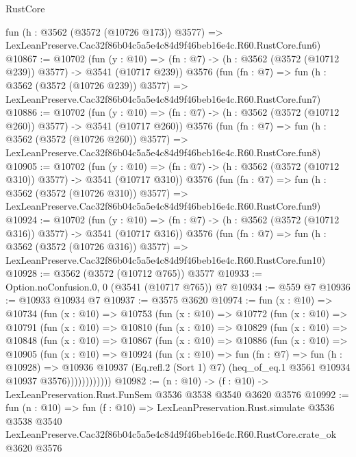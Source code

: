 \begin{lexlean}{RustCore}
\begin{coremodule}
    fun (h : @3562 (@3572 (@10726 @173)) @3577) =>
    LexLeanPreserve.Cac32f86b04c5a5e4c84d9f46beb16e4c.R60.RustCore.fun6)
@10867 := @10702
    (fun (y : @10) => (fn : @7) -> (h : @3562 (@3572 (@10712 @239)) @3577) -> @3541 (@10717 @239))
    @3576
    (fun (fn : @7) =>
    fun (h : @3562 (@3572 (@10726 @239)) @3577) =>
    LexLeanPreserve.Cac32f86b04c5a5e4c84d9f46beb16e4c.R60.RustCore.fun7)
@10886 := @10702
    (fun (y : @10) => (fn : @7) -> (h : @3562 (@3572 (@10712 @260)) @3577) -> @3541 (@10717 @260))
    @3576
    (fun (fn : @7) =>
    fun (h : @3562 (@3572 (@10726 @260)) @3577) =>
    LexLeanPreserve.Cac32f86b04c5a5e4c84d9f46beb16e4c.R60.RustCore.fun8)
@10905 := @10702
    (fun (y : @10) => (fn : @7) -> (h : @3562 (@3572 (@10712 @310)) @3577) -> @3541 (@10717 @310))
    @3576
    (fun (fn : @7) =>
    fun (h : @3562 (@3572 (@10726 @310)) @3577) =>
    LexLeanPreserve.Cac32f86b04c5a5e4c84d9f46beb16e4c.R60.RustCore.fun9)
@10924 := @10702
    (fun (y : @10) => (fn : @7) -> (h : @3562 (@3572 (@10712 @316)) @3577) -> @3541 (@10717 @316))
    @3576
    (fun (fn : @7) =>
    fun (h : @3562 (@3572 (@10726 @316)) @3577) =>
    LexLeanPreserve.Cac32f86b04c5a5e4c84d9f46beb16e4c.R60.RustCore.fun10)
@10928 := @3562 (@3572 (@10712 @765)) @3577
@10933 := Option.noConfusion.{0, 0} (@3541 (@10717 @765)) @7
@10934 := @559 @7
@10936 := @10933 @10934 @7
@10937 := @3575 @3620
@10974 := fun (x : @10) =>
  @10734
    (fun (x : @10) =>
    @10753
      (fun (x : @10) =>
      @10772
        (fun (x : @10) =>
        @10791
          (fun (x : @10) =>
          @10810
            (fun (x : @10) =>
            @10829
              (fun (x : @10) =>
              @10848
                (fun (x : @10) =>
                @10867
                  (fun (x : @10) =>
                  @10886
                    (fun (x : @10) =>
                    @10905
                      (fun (x : @10) =>
                      @10924
                        (fun (x : @10) =>
                        fun (fn : @7) =>
                        fun (h : @10928) =>
                        @10936
                          @10937
                          (Eq.refl.{2} (Sort 1) @7)
                          (heq_of_eq.{1} @3561 @10934 @10937 @3576))))))))))))
@10982 := (n : @10) -> (f : @10) -> LexLeanPreservation.Rust.FunSem @3536 @3538 @3540 @3620 @3576
@10992 := fun (n : @10) =>
  fun (f : @10) =>
  LexLeanPreservation.Rust.simulate
    @3536
    @3538
    @3540
    LexLeanPreserve.Cac32f86b04c5a5e4c84d9f46beb16e4c.R60.RustCore.crate_ok
    @3620
    @3576
\end{coremodule}
\end{lexlean}
